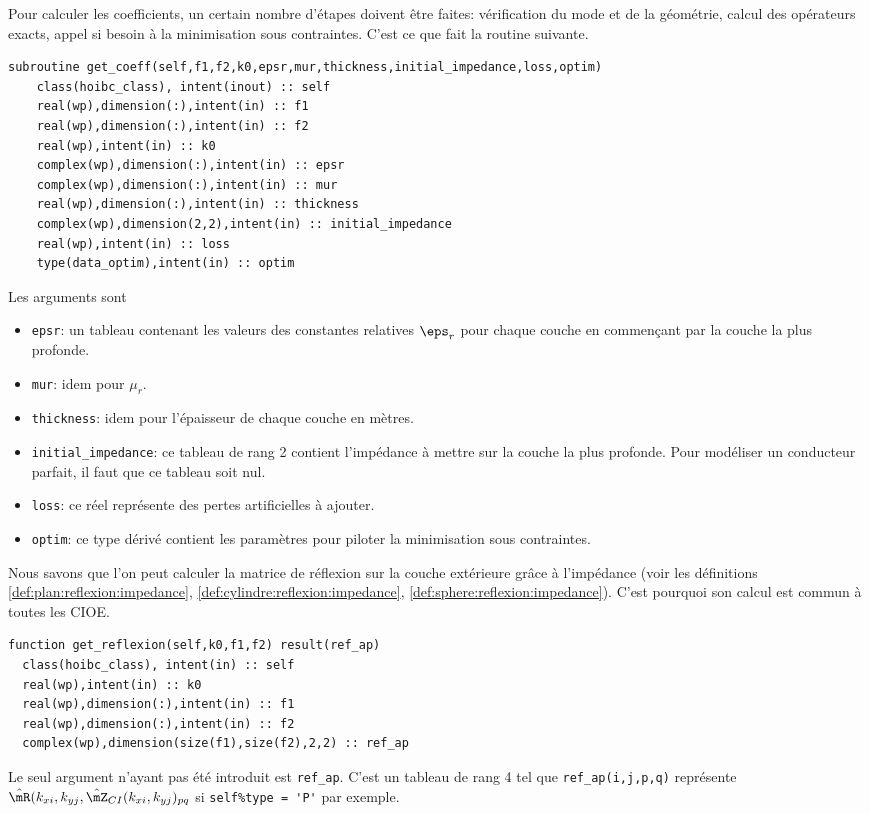       Pour calculer les coefficients, un certain nombre d'étapes doivent être faites: vérification du mode et de la géométrie, calcul des opérateurs exacts, appel si besoin à la minimisation sous contraintes. C'est ce que fait la routine suivante.
\begin{lstlisting}
subroutine get_coeff(self,f1,f2,k0,epsr,mur,thickness,initial_impedance,loss,optim)
    class(hoibc_class), intent(inout) :: self
    real(wp),dimension(:),intent(in) :: f1
    real(wp),dimension(:),intent(in) :: f2
    real(wp),intent(in) :: k0
    complex(wp),dimension(:),intent(in) :: epsr
    complex(wp),dimension(:),intent(in) :: mur
    real(wp),dimension(:),intent(in) :: thickness
    complex(wp),dimension(2,2),intent(in) :: initial_impedance
    real(wp),intent(in) :: loss
    type(data_optim),intent(in) :: optim
\end{lstlisting}
      Les arguments sont
      \begin{itemize}
        \item \lstinline{epsr}: un tableau contenant les valeurs des constantes relatives \(\eps_r\) pour chaque couche en commençant par la couche la plus profonde.
        \item \lstinline{mur}: idem pour \(\mu_r\).
        \item \lstinline{thickness}: idem pour l'épaisseur de chaque couche en mètres.
        \item \lstinline{initial_impedance}: ce tableau de rang 2 contient l'impédance à mettre sur la couche la plus profonde. Pour modéliser un conducteur parfait, il faut que ce tableau soit nul.
        \item \lstinline{loss}: ce réel représente des pertes artificielles à ajouter.
        \item \lstinline{optim}: ce type dérivé contient les paramètres pour piloter la minimisation sous contraintes.
      \end{itemize}

      Nous savons que l'on peut calculer la matrice de réflexion sur la couche extérieure grâce à l'impédance (voir les définitions \ref{def:plan:reflexion:impedance}, \ref{def:cylindre:reflexion:impedance}, \ref{def:sphere:reflexion:impedance}). C'est pourquoi son calcul est commun à toutes les CIOE.
\begin{lstlisting}
function get_reflexion(self,k0,f1,f2) result(ref_ap)
  class(hoibc_class), intent(in) :: self
  real(wp),intent(in) :: k0    
  real(wp),dimension(:),intent(in) :: f1
  real(wp),dimension(:),intent(in) :: f2
  complex(wp),dimension(size(f1),size(f2),2,2) :: ref_ap
\end{lstlisting}
      Le seul argument n'ayant pas été introduit est \lstinline{ref_ap}. C'est un tableau de rang 4 tel que \lstinline{ref_ap(i,j,p,q)} représente \(\hat\mR(k_{xi},k_{yj},\hat\mZ_{CI}(k_{xi},k_{yj})_{pq}\) si \lstinline{self%type = 'P'} par exemple.

